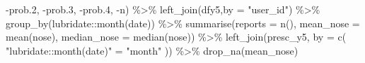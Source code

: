 \documentclass[
]{article}
\newenvironment{Shaded}{\begin{snugshade}}{\end{snugshade}}
\newcommand{\AttributeTok}[1]{\textcolor[rgb]{0.77,0.63,0.00}{#1}}
\newcommand{\FloatTok}[1]{\textcolor[rgb]{0.00,0.00,0.81}{#1}}
\newcommand{\FunctionTok}[1]{\textcolor[rgb]{0.00,0.00,0.00}{#1}}
\newcommand{\NormalTok}[1]{#1}
\newcommand{\OtherTok}[1]{\textcolor[rgb]{0.56,0.35,0.01}{#1}}
\newcommand{\SpecialCharTok}[1]{\textcolor[rgb]{0.00,0.00,0.00}{#1}}
\newcommand{\StringTok}[1]{\textcolor[rgb]{0.31,0.60,0.02}{#1}}
\begin{document}
\begin{Shaded}
\begin{Highlighting}[]
                 \SpecialCharTok{{-}}\NormalTok{prob}\FloatTok{.2}\NormalTok{,}
                 \SpecialCharTok{{-}}\NormalTok{prob}\FloatTok{.3}\NormalTok{,}
                 \SpecialCharTok{{-}}\NormalTok{prob}\FloatTok{.4}\NormalTok{,}
                 \SpecialCharTok{{-}}\NormalTok{n) }\SpecialCharTok{\%\textgreater{}\%} 
   \FunctionTok{left\_join}\NormalTok{(dfy5,}\AttributeTok{by =} \StringTok{"user\_id"}\NormalTok{) }\SpecialCharTok{\%\textgreater{}\%}  
   \FunctionTok{group\_by}\NormalTok{(lubridate}\SpecialCharTok{::}\FunctionTok{month}\NormalTok{(date)) }\SpecialCharTok{\%\textgreater{}\%}
   \FunctionTok{summarise}\NormalTok{(}\AttributeTok{reports =} \FunctionTok{n}\NormalTok{(),}
             \AttributeTok{mean\_nose =} \FunctionTok{mean}\NormalTok{(nose),}
             \AttributeTok{median\_nose =} \FunctionTok{median}\NormalTok{(nose)) }\SpecialCharTok{\%\textgreater{}\%}
   \FunctionTok{left\_join}\NormalTok{(presc\_y5, }\AttributeTok{by =} \FunctionTok{c}\NormalTok{( }\StringTok{"lubridate::month(date)"} \OtherTok{=} \StringTok{"month"}\NormalTok{ )) }\SpecialCharTok{\%\textgreater{}\%} 
   \FunctionTok{drop\_na}\NormalTok{(mean\_nose) }
 

\end{Highlighting}
\end{Shaded}
\end{document}
